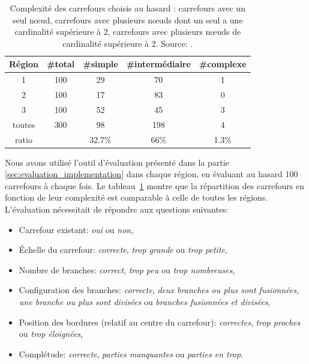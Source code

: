 \begin{table}[ht]
    \centering
    \footnotesize
    \begin{tabular}{c|c|c|c|c}
    Région & \#total & \#simple &\#intermédiaire& \#complexe \\
    \hline
     1 & 100 & 29 & 70 & 1 \\
     2 & 100 & 17 & 83 & 0 \\
     3 & 100 & 52 & 45 & 3 \\
     \hline
     toutes & 300 & 98 & 198 & 4 \\
     \hline
     ratio & &  32.7\% & 66\% & 1.3\%\\
    \end{tabular}
    \caption{Complexité des carrefours choisis au hasard : carrefours avec un seul nœud, carrefours avec plusieurs nœuds dont un seul a une cardinalité supérieure à 2, carrefours avec plusieurs nœuds de cardinalité supérieure à 2. Source: \cite{Favreau2022}.}
    \label{tab:selectedRegions}
\end{table}

Nous avons utilisé l'outil d'évaluation présenté dans la partie \ref{sec:evaluation_implementation}
dans chaque région, en évaluant au hasard 100 carrefours à chaque fois. Le tableau~\ref{tab:selectedRegions} montre que la répartition des carrefours en fonction de leur complexité est comparable à celle de toutes les régions. L'évaluation nécessitait de répondre aux questions suivantes:
\begin{itemize}
    \item Carrefour existant: \textit{oui} ou \textit{non},
    \item Échelle du carrefour: \textit{correcte}, \textit{trop grande} ou \textit{trop petite},
    \item Nombre de branches: \textit{correct}, \textit{trop peu} ou \textit{trop nombreuses},
    \item Configuration des branches: \textit{correcte}, \textit{deux branches ou plus sont fusionnées}, \textit{une branche ou plus sont divisées} ou \textit{branches fusionnées et divisées},
    \item Position des bordures (relatif au centre du carrefour): \textit{correctes}, \textit{trop proches} ou \textit{trop éloignées},
    \item Complétude: \textit{correcte}, \textit{parties manquantes} ou \textit{parties en trop}.
\end{itemize}

\newpar{}

